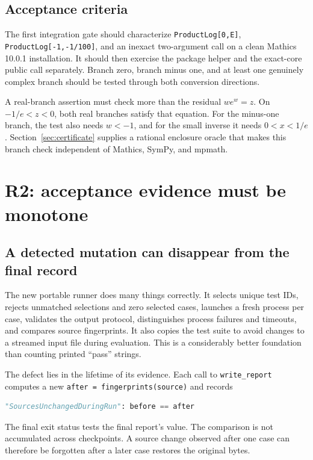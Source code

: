 \documentclass[11pt,a4paper]{article}
\newcommand{\code}[1]{\texttt{#1}}
\begin{document}
\subsection{Acceptance criteria}
The first integration gate should characterize \code{ProductLog[0,E]}, \code{ProductLog[-1,-1/100]}, and an inexact two-argument call on a clean Mathics 10.0.1 installation. It should then exercise the package helper and the exact-core public call separately. Branch zero, branch minus one, and at least one genuinely complex branch should be tested through both conversion directions.

A real-branch assertion must check more than the residual $w e^w=z$. On $-1/e<z<0$, both real branches satisfy that equation. For the minus-one branch, the test also needs $w<-1$, and for the small inverse it needs $0<x<1/e$. Section~\ref{sec:certificate} supplies a rational enclosure oracle that makes this branch check independent of Mathics, SymPy, and mpmath.

\section{R2: acceptance evidence must be monotone}
\label{sec:runner}
\subsection{A detected mutation can disappear from the final record}
The new portable runner does many things correctly. It selects unique test IDs, rejects unmatched selections and zero selected cases, launches a fresh process per case, validates the output protocol, distinguishes process failures and timeouts, and compares source fingerprints. It also copies the test suite to avoid changes to a streamed input file during evaluation. This is a considerably better foundation than counting printed ``pass'' strings.\cite{runner}

The defect lies in the lifetime of its evidence. Each call to \code{write\_report} computes a new \code{after = fingerprints(source)} and records
\begin{lstlisting}[language=Python]
"SourcesUnchangedDuringRun": before == after
\end{lstlisting}
The final exit status tests the final report's value. The comparison is not accumulated across checkpoints. A source change observed after one case can therefore be forgotten after a later case restores the original bytes.\cite{runner}
\end{document}
